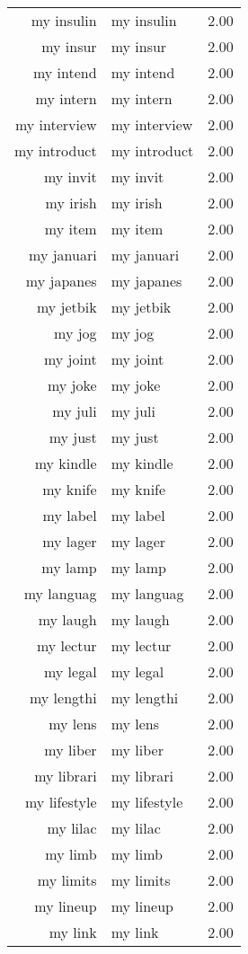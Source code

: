\begin{table}[ht]
\begin{tabular}{rlr}
  my insulin & my insulin & 2.00 \\ 
  my insur & my insur & 2.00 \\ 
  my intend & my intend & 2.00 \\ 
  my intern & my intern & 2.00 \\ 
  my interview & my interview & 2.00 \\ 
  my introduct & my introduct & 2.00 \\ 
  my invit & my invit & 2.00 \\ 
  my irish & my irish & 2.00 \\ 
  my item & my item & 2.00 \\ 
  my januari & my januari & 2.00 \\ 
  my japanes & my japanes & 2.00 \\ 
  my jetbik & my jetbik & 2.00 \\ 
  my jog & my jog & 2.00 \\ 
  my joint & my joint & 2.00 \\ 
  my joke & my joke & 2.00 \\ 
  my juli & my juli & 2.00 \\ 
  my just & my just & 2.00 \\ 
  my kindle & my kindle & 2.00 \\ 
  my knife & my knife & 2.00 \\ 
  my label & my label & 2.00 \\ 
  my lager & my lager & 2.00 \\ 
  my lamp & my lamp & 2.00 \\ 
  my languag & my languag & 2.00 \\ 
  my laugh & my laugh & 2.00 \\ 
  my lectur & my lectur & 2.00 \\ 
  my legal & my legal & 2.00 \\ 
  my lengthi & my lengthi & 2.00 \\ 
  my lens & my lens & 2.00 \\ 
  my liber & my liber & 2.00 \\ 
  my librari & my librari & 2.00 \\ 
  my lifestyle & my lifestyle & 2.00 \\ 
  my lilac & my lilac & 2.00 \\ 
  my limb & my limb & 2.00 \\ 
  my limits & my limits & 2.00 \\ 
  my lineup & my lineup & 2.00 \\ 
  my link & my link & 2.00 \\ 

\end{tabular}
\end{table}

